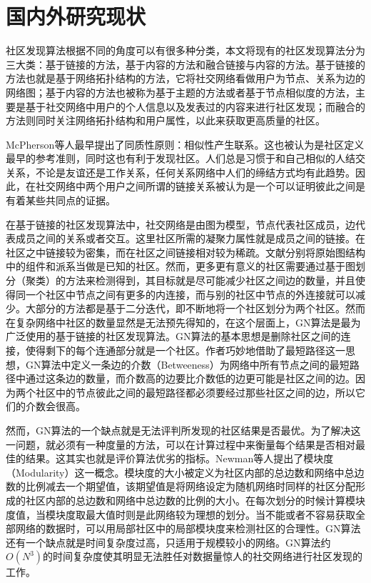 \section{国内外研究现状}%
社区发现算法根据不同的角度可以有很多种分类，本文将现有的社区发现算法分为三大类：基于链接的方法，基于内容的方法和融合链接与内容的方法。基于链接的方法也就是基于网络拓扑结构的方法，它将社交网络看做用户为节点、关系为边的网络图；基于内容的方法也被称为基于主题的方法或者基于节点相似度的方法，主要是基于社交网络中用户的个人信息以及发表过的内容来进行社区发现；而融合的方法则同时关注网络拓扑结构和用户属性，以此来获取更高质量的社区。

McPherson等人最早提出了同质性原则：相似性产生联系\cite{Mcpherson2001Birds}。这也被认为是社区定义最早的参考准则，同时这也有利于发现社区。人们总是习惯于和自己相似的人结交关系，不论是友谊还是工作关系，任何关系网络中人们的缔结方式均有此趋势。因此，在社交网络中两个用户之间所谓的链接关系被认为是一个可以证明彼此之间是有着某些共同点的证据。

在基于链接的社区发现算法中，社交网络是由图为模型，节点代表社区成员，边代表成员之间的关系或者交互。这里社区所需的凝聚力属性就是成员之间的链接。在社区之中链接较为密集，而在社区之间链接相对较为稀疏。文献\cite{Fortunato2009Community}分别将原始图结构中的组件和派系当做是已知的社区。然而，更多更有意义的社区需要通过基于图划分（聚类）的方法来检测得到，其目标就是尽可能减少社区之间边的数量，并且使得同一个社区中节点之间有更多的内连接，而与别的社区中节点的外连接就可以减少。大部分的方法都是基于二分迭代，即不断地将一个社区划分为两个社区。然而在复杂网络中社区的数量显然是无法预先得知的，在这个层面上，GN算法\cite{2002Community}是最为广泛使用的基于链接的社区发现算法。GN算法的基本思想是删除社区之间的连接，使得剩下的每个连通部分就是一个社区。作者巧妙地借助了最短路径这一思想，GN算法中定义一条边的介数（Betweeness）为网络中所有节点之间的最短路径中通过这条边的数量，而介数高的边要比介数低的边更可能是社区之间的边。因为两个社区中的节点彼此之间的最短路径都必须要经过那些社区之间的边，所以它们的介数会很高。

然而，GN算法的一个缺点就是无法评判所发现的社区结果是否最优。为了解决这一问题，就必须有一种度量的方法，可以在计算过程中来衡量每个结果是否相对最佳的结果。这其实也就是评价算法优劣的指标。Newman等人提出了模块度（Modularity）\cite{NewmanFind}这一概念。模块度的大小被定义为社区内部的总边数和网络中总边数的比例减去一个期望值，该期望值是将网络设定为随机网络时同样的社区分配形成的社区内部的总边数和网络中总边数的比例的大小。在每次划分的时候计算模块度值，当模块度取最大值时则是此网络较为理想的划分。当不能或者不容易获取全部网络的数据时，可以用局部社区中的局部模块度来检测社区的合理性。GN算法还有一个缺点就是时间复杂度过高，只适用于规模较小的网络。GN算法约$O(N^3)$的时间复杂度使其明显无法胜任对数据量惊人的社交网络进行社区发现的工作。

